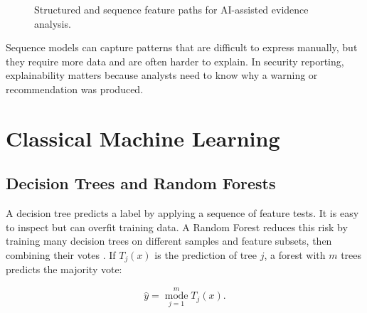 \begin{figure}[H]
\centering
{}
\caption{Structured and sequence feature paths for AI-assisted evidence analysis.}
\label{fig:pfe-ai-feature-pipeline}
\end{figure}

Sequence models can capture patterns that are difficult to express manually,
but they require more data and are often harder to explain. In security
reporting, explainability matters because analysts need to know why a warning
or recommendation was produced.

\section{Classical Machine Learning}

\subsection{Decision Trees and Random Forests}

A decision tree predicts a label by applying a sequence of feature tests. It
is easy to inspect but can overfit training data. A Random Forest reduces this
risk by training many decision trees on different samples and feature subsets,
then combining their votes \cite{breiman2001randomforests}. If \(T_j(x)\) is
the prediction of tree \(j\), a forest with \(m\) trees predicts the majority
vote:

\begin{equation}
\label{eq:pfe-ai-random-forest-vote}
\hat{y}=\operatorname*{mode}_{j=1}^{m} T_j(x).
\end{equation}

